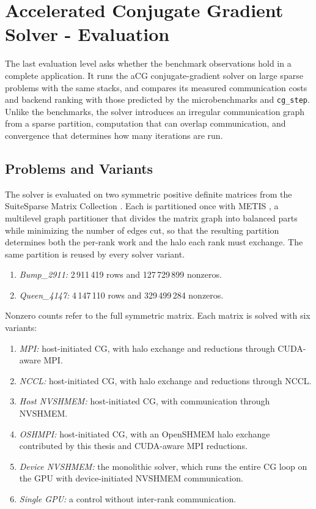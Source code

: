 \section{Accelerated Conjugate Gradient Solver - Evaluation}\label{sec:acg-method}

The last evaluation level asks whether the benchmark observations hold in a complete application. It runs the aCG conjugate-gradient solver \cite{trotter_cpu-_2025} on large sparse problems with the same stacks, and compares its measured communication costs and backend ranking with those predicted by the microbenchmarks and \texttt{cg\_step}. Unlike the benchmarks, the solver introduces an irregular communication graph from a sparse partition, computation that can overlap communication, and convergence that determines how many iterations are run.

\subsection{Problems and Variants}

The solver is evaluated on two symmetric positive definite matrices from the SuiteSparse Matrix Collection \cite{davis_suitesparse_2011}. Each is partitioned once with METIS \cite{karypis_metis_2026}, a multilevel graph partitioner that divides the matrix graph into balanced parts while minimizing the number of edges cut, so that the resulting partition determines both the per-rank work and the halo each rank must exchange. The same partition is reused by every solver variant.

\begin{enumerate}
    \item \emph{Bump\_2911:} 2\,911\,419 rows and 127\,729\,899 nonzeros.
    \item \emph{Queen\_4147:} 4\,147\,110 rows and 329\,499\,284 nonzeros.
\end{enumerate}

Nonzero counts refer to the full symmetric matrix. Each matrix is solved with six variants:

\begin{enumerate}
    \item \emph{MPI:} host-initiated CG, with halo exchange and reductions through CUDA-aware MPI.
    \item \emph{NCCL:} host-initiated CG, with halo exchange and reductions through NCCL.
    \item \emph{Host NVSHMEM:} host-initiated CG, with communication through NVSHMEM.
    \item \emph{OSHMPI:} host-initiated CG, with an OpenSHMEM halo exchange contributed by this thesis and CUDA-aware MPI reductions.
    \item \emph{Device NVSHMEM:} the monolithic solver, which runs the entire CG loop on the GPU with device-initiated NVSHMEM communication.
    \item \emph{Single GPU:} a control without inter-rank communication.
\end{enumerate}

